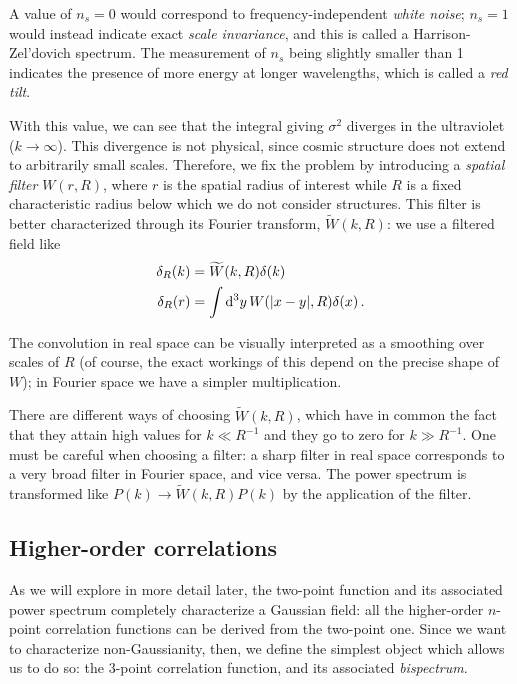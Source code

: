 \documentclass[main.tex]{subfiles}
\begin{document}
A value of \(n_s = 0\) would correspond to frequency-independent \emph{white noise}; \(n_s = 1\) would instead indicate exact \emph{scale invariance}, and this is called a Harrison-Zel'dovich spectrum.
The measurement of \(n_s\) being slightly smaller than 1 indicates the presence of more energy at longer wavelengths, which is called a \emph{red tilt}. 

With this value, we can see that the integral giving \(\sigma^2\) diverges in the ultraviolet (\(k \to \infty\)). 
This divergence is not physical, since cosmic structure does not extend to arbitrarily small scales. Therefore, we fix the problem by introducing a \emph{spatial filter} \(W(r, R)\), where \(r\) is the spatial radius of interest while \(R\) is a fixed characteristic radius below which we do not consider structures. This filter is better characterized through its Fourier transform, \(\widetilde{W}(k, R)\): we use a filtered field like 
%
\begin{align}
\delta_R (k) &= \widetilde{W}(k, R) \delta (k)  \\
\delta _R(r) &= \int \dd[3]{y} W(\abs{x-y}, R) \delta (x)
\,.
\end{align}

The convolution in real space can be visually interpreted as a smoothing over scales of \(R\) (of course, the exact workings of this depend on the precise shape of \(W\)); in Fourier space we have a simpler multiplication.

There are different ways of choosing \(\widetilde{W}(k, R)\), which have in common the fact that they attain high values for \(k \ll R^{-1}\) and they go to zero for \(k \gg R^{-1}\). 
One must be careful when choosing a filter: a sharp filter in real space corresponds to a very broad filter in Fourier space, and vice versa. 
The power spectrum is transformed like \(P(k) \to \widetilde{W}(k, R) P(k)\) by the application of the filter.

\subsection{Higher-order correlations}

As we will explore in more detail later, the two-point function and its associated power spectrum completely characterize a Gaussian field: all the higher-order \(n\)-point correlation functions can be derived from the two-point one.
Since we want to characterize non-Gaussianity, then, we define the simplest object which allows us to do so: the 3-point correlation function, and its associated \emph{bispectrum}.
\end{document}
